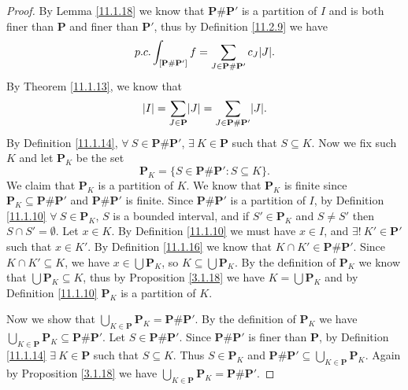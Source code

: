 \begin{proof}
    By Lemma \ref{11.1.18} we know that \(\mathbf{P} \# \mathbf{P}'\) is a partition of \(I\) and is both finer than \(\mathbf{P}\) and finer than \(\mathbf{P}'\), thus by Definition \ref{11.2.9} we have
    \[
        p.c. \int_{[\mathbf{P} \# \mathbf{P}']} f = \sum_{J \in \mathbf{P} \# \mathbf{P}'} c_J \abs*{J}.
    \]
    By Theorem \ref{11.1.13}, we know that
    \[
        \abs*{I} = \sum_{J \in \mathbf{P}} \abs*{J} = \sum_{J \in \mathbf{P} \# \mathbf{P}'} \abs*{J}.
    \]
    By Definition \ref{11.1.14}, \(\forall\ S \in \mathbf{P} \# \mathbf{P}'\), \(\exists\ K \in \mathbf{P}\) such that \(S \subseteq K\).
    Now we fix such \(K\) and let \(\mathbf{P}_K\) be the set
    \[
        \mathbf{P}_K = \{S \in \mathbf{P} \# \mathbf{P}' : S \subseteq K\}.
    \]
    We claim that \(\mathbf{P}_K\) is a partition of \(K\).
    We know that \(\mathbf{P}_K\) is finite since \(\mathbf{P}_K \subseteq \mathbf{P} \# \mathbf{P}'\) and \(\mathbf{P} \# \mathbf{P}'\) is finite.
    Since \(\mathbf{P} \# \mathbf{P}'\) is a partition of \(I\), by Definition \ref{11.1.10} \(\forall\ S \in \mathbf{P}_K\), \(S\) is a bounded interval, and if \(S' \in \mathbf{P}_K\) and \(S \neq S'\) then \(S \cap S' = \emptyset\).
    Let \(x \in K\).
    By Definition \ref{11.1.10} we must have \(x \in I\), and \(\exists!\ K' \in \mathbf{P}'\) such that \(x \in K'\).
    By Definition \ref{11.1.16} we know that \(K \cap K' \in \mathbf{P} \# \mathbf{P}'\).
    Since \(K \cap K' \subseteq K\), we have \(x \in \bigcup \mathbf{P}_K\), so \(K \subseteq \bigcup \mathbf{P}_K\).
    By the definition of \(\mathbf{P}_K\) we know that \(\bigcup \mathbf{P}_K \subseteq K\), thus by Proposition \ref{3.1.18} we have \(K = \bigcup \mathbf{P}_K\) and by Definition \ref{11.1.10} \(\mathbf{P}_K\) is a partition of \(K\).

    Now we show that \(\bigcup_{K \in \mathbf{P}} \mathbf{P}_K = \mathbf{P} \# \mathbf{P}'\).
    By the definition of \(\mathbf{P}_K\) we have \(\bigcup_{K \in \mathbf{P}} \mathbf{P}_K \subseteq \mathbf{P} \# \mathbf{P}'\).
    Let \(S \in \mathbf{P} \# \mathbf{P}'\).
    Since \(\mathbf{P} \# \mathbf{P}'\) is finer than \(\mathbf{P}\), by Definition \ref{11.1.14} \(\exists\ K \in \mathbf{P}\) such that \(S \subseteq K\).
    Thus \(S \in \mathbf{P}_K\) and \(\mathbf{P} \# \mathbf{P}' \subseteq \bigcup_{K \in \mathbf{P}} \mathbf{P}_K\).
    Again by Proposition \ref{3.1.18} we have \(\bigcup_{K \in \mathbf{P}} \mathbf{P}_K = \mathbf{P} \# \mathbf{P}'\).


\end{proof}
